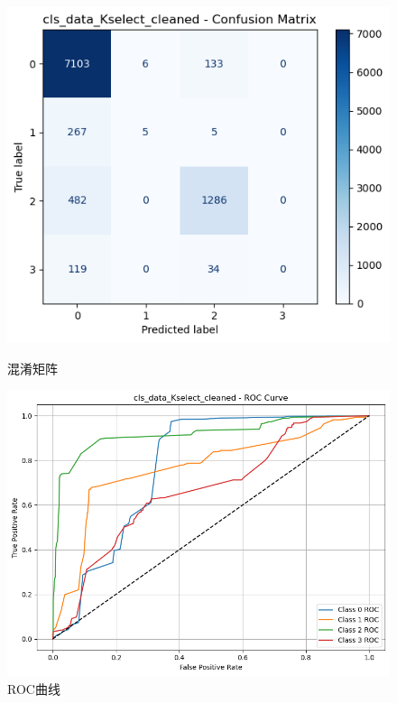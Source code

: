 \documentclass[10pt]{article}
\begin{document}
\begin{figure}[H]
\centering
\begin{minipage}[t]{0.45\textwidth}
  \centering
  \includegraphics[width=\linewidth]{cls_svm_10sc.png}
  \caption{混淆矩阵}
  \label{fig:75}
\end{minipage}
\hfill
\begin{minipage}[t]{0.52\textwidth}
  \centering
  \includegraphics[width=\linewidth]{cls_svm_10sc2.png}
  \caption{ROC曲线}
  \label{fig:76}
\end{minipage}
\end{figure}
\end{document}
